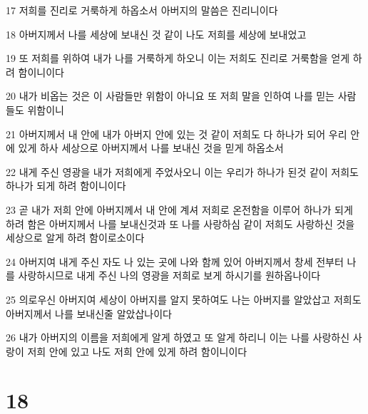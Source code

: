 \par 17 저희를 진리로 거룩하게 하옵소서 아버지의 말씀은 진리니이다
\par 18 아버지께서 나를 세상에 보내신 것 같이 나도 저희를 세상에 보내었고
\par 19 또 저희를 위하여 내가 나를 거룩하게 하오니 이는 저희도 진리로 거룩함을 얻게 하려 함이니이다
\par 20 내가 비옵는 것은 이 사람들만 위함이 아니요 또 저희 말을 인하여 나를 믿는 사람들도 위함이니
\par 21 아버지께서 내 안에 내가 아버지 안에 있는 것 같이 저희도 다 하나가 되어 우리 안에 있게 하사 세상으로 아버지께서 나를 보내신 것을 믿게 하옵소서
\par 22 내게 주신 영광을 내가 저희에게 주었사오니 이는 우리가 하나가 된것 같이 저희도 하나가 되게 하려 함이니이다
\par 23 곧 내가 저희 안에 아버지께서 내 안에 계셔 저희로 온전함을 이루어 하나가 되게 하려 함은 아버지께서 나를 보내신것과 또 나를 사랑하심 같이 저희도 사랑하신 것을 세상으로 알게 하려 함이로소이다
\par 24 아버지여 내게 주신 자도 나 있는 곳에 나와 함께 있어 아버지께서 창세 전부터 나를 사랑하시므로 내게 주신 나의 영광을 저희로 보게 하시기를 원하옵나이다
\par 25 의로우신 아버지여 세상이 아버지를 알지 못하여도 나는 아버지를 알았삽고 저희도 아버지께서 나를 보내신줄 알았삽나이다
\par 26 내가 아버지의 이름을 저희에게 알게 하였고 또 알게 하리니 이는 나를 사랑하신 사랑이 저희 안에 있고 나도 저희 안에 있게 하려 함이니이다

\chapter{18}

